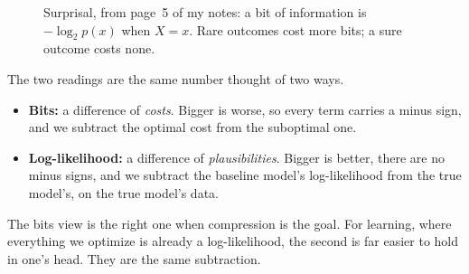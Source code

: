 \documentclass[11pt,oneside]{book}
\theoremstyle{definition}
\theoremstyle{plain}
\theoremstyle{remark}
\begin{document}
\begin{figure}[t]
\centering
{}
\caption{Surprisal, from page~5 of my notes: a bit of information is $-\log_2 p(x)$ when $X=x$. Rare outcomes cost more
bits; a sure outcome costs none.}
\label{fig:surprisal}
\end{figure}

The two readings are the same number thought of two ways.
\begin{itemize}
\item \textbf{Bits:} a difference of \emph{costs}. Bigger is worse, so every term carries a minus sign, and we subtract
the optimal cost from the suboptimal one.
\item \textbf{Log-likelihood:} a difference of \emph{plausibilities}. Bigger is better, there are no minus signs, and we
subtract the baseline model's log-likelihood from the true model's, on the true model's data.
\end{itemize}
The bits view is the right one when compression is the goal. For learning, where everything we optimize is already a
log-likelihood, the second is far easier to hold in one's head. They are the same subtraction.
\end{document}

